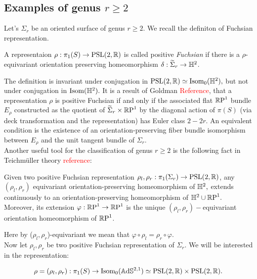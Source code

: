 
\subsection{Examples of genus $r\geq 2$}
Let's $\Sigma_r$ be an oriented surface of genus $r\geq 2.$ We recall the definiton of Fuchsian representation. 

\begin{definition}
    A representaion $\rho:\pi_1(S)\to \text{PSL}(2,\mathbb{R})$ is called positive \textit{Fuchsian} if there is a $\rho$-equivariant orientation preserving homeomorphism $\delta:\widetilde{\Sigma}_r\to\mathbb{H}^2$.
\end{definition}

The definition is invariant under conjugation in $\text{PSL}(2,\mathbb{R})\simeq\text{Isom}_0(\mathbb{H}^2),$ but not under conjugation in $\text{Isom}(\mathbb{H}^2).$ It is a result of Goldman \textcolor{red}{Reference}, that a representation $\rho$ is positive Fuchsian if and only if the associated flat $\mathbb{R}\text{P}^1$ bundle $E_\rho$ constructed as the quotient of $\widetilde{\Sigma}_r\times\mathbb{R}\text{P}^1$ by the diagonal action of $\pi(S)$ (via deck transformation and the representation) has Euler class $2-2r.$ An equivalent condition is the existence of an orientation-preserving fiber bundle isomorphism between $E_\rho$ and the unit tangent bundle of $\Sigma_r.$ \\   

Another useful tool for the classification of genus $r\geq 2$ is the following fact in Teichm\"uller theory \textcolor{red}{reference}:

\begin{lemma}
    Given two positive Fuchsian representation $\rho_l,\rho_r:\pi_1(\Sigma_r)\to\text{PSL}(2,\mathbb{R})$, any $(\rho_l,\rho_r)$ equivariant orientation-preserving homeomorphism of $\mathbb{H}^2,$ extends continuously to an orientation-preserving homeomorphism of $\mathbb{H}^2\cup\mathbb{R}\text{P}^1.$ Moreover, its extension $\varphi:\mathbb{R}\text{P}^1\to\mathbb{R}\text{P}^1$ is the unique $(\rho_l,\rho_r)-$equivariant orientation homeomorphism of $\mathbb{R}\text{P}^1$.     
\end{lemma}

Here by ($\rho_l,\rho_r$)-equivariant we mean that $\varphi\circ\rho_l=\rho_r\circ\varphi.$\\
Now let $\rho_l,\rho_r$ be two positive Fuchsian representation of $\Sigma_r.$ We will be interested in the representation:

\[
    \rho=(\rho_l,\rho_r):\pi_1(S)\to\text{Isom}_0(\mathbb{A}\mathrm{d}\mathbb{S}^{2,1})\simeq \text{PSL}(2,\mathbb{R})\times\text{PSL}(2,\mathbb{R}).
\]

